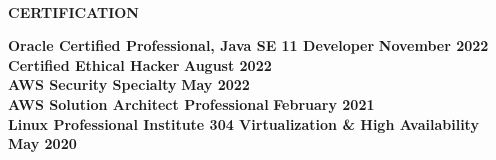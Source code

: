 \begin{center}
    \hrulefill \\
    \begin{large}
        \textbf{CERTIFICATION} \\
    \end{large} 
\end{center}
\textbf{Oracle Certified Professional, Java SE 11 Developer} \hfill \textbf{November 2022} \\
\textbf{Certified Ethical Hacker} \hfill \textbf{August 2022} \\
\textbf{AWS Security Specialty} \hfill \textbf{May 2022} \\
\textbf{AWS Solution Architect Professional} \hfill \textbf{February 2021} \\
\textbf{Linux Professional Institute 304 Virtualization \& High Availability} \hfill \textbf{May 2020}